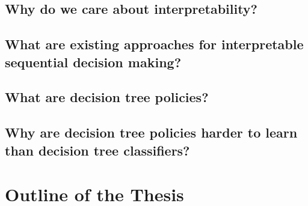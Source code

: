 \subsection{Why do we care about interpretability?}


\subsection{What are existing approaches for interpretable sequential decision making?}


\subsection{What are decision tree policies?}


\subsection{Why are decision tree policies harder to learn than decision tree classifiers?}

\section{Outline of the Thesis}